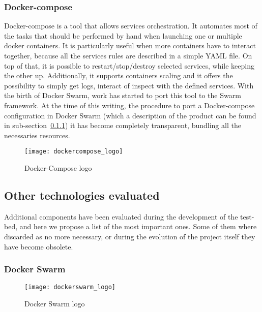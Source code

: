 \subsubsection{Docker-compose} 
Docker-compose is a tool that allows services orchestration. It automates most
of the tasks that should be performed by hand when launching one or multiple
docker containers. It is particularly useful when more containers have to
interact together, because all the services rules are described in a simple YAML
file. On top of that, it is possible to restart/stop/destroy selected services,
while keeping the other up. Additionally, it supports containers scaling and it
offers the possibility to simply get logs, interact of inspect with the defined
services. With the birth of Docker Swarm, work has started to port this tool to
the Swarm framework. At the time of this writing, the procedure to port a
Docker-compose configuration in Docker Swarm (which a description of the product
can be found in sub-section~\ref{chap:prjan:sec:tech:sub:other:sub:swarm}) it
has become completely transparent, bundling all the necessaries resources.

\begin{figure}[h]
  \centering
  \texttt{[image: dockercompose\_logo]}
  \caption[Docker-Compose logo]{Docker-Compose logo}
\end{figure}

\subsection{Other technologies evaluated}

Additional components have been evaluated during the development of the 
test-bed, and here we propose a list of the most important ones. Some of them 
where discarded as no more necessary, or during the evolution of the project 
itself they have become obsolete.

\subsubsection{Docker Swarm}
\label{chap:prjan:sec:tech:sub:other:sub:swarm}

\begin{figure}[h]
  \centering
  \texttt{[image: dockerswarm\_logo]}
  \caption[Docker Swarm logo]{Docker Swarm logo}
\end{figure}

